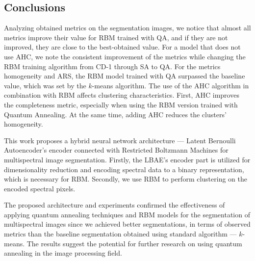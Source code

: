 \documentclass[a4paper,12pt]{article}
\begin{document}
\subsection{Conclusions}

Analyzing obtained metrics on the segmentation images, we notice that almost all metrics improve their value for RBM trained with QA, and if they are not improved, they are close to the best-obtained value. For a model that does not use AHC, we note the consistent improvement of the metrics while changing the RBM training algorithm from CD-1 through SA to QA. For the metrics homogeneity and ARS, the RBM model trained with QA surpassed the baseline value, which was set by the $k$-means algorithm. The use of the AHC algorithm in combination with RBM affects clustering characteristics. First, AHC improves the completeness metric, especially when using the RBM version trained with Quantum Annealing. At the same time, adding AHC reduces the clusters' homogeneity. 

This work proposes a hybrid neural network architecture --- Latent Bernoulli Autoencoder's encoder connected with Restricted Boltzmann Machines for multispectral image segmentation. Firstly, the LBAE's encoder part is utilized for dimensionality reduction and encoding spectral data to a binary representation, which is necessary for RBM. Secondly, we use RBM to perform clustering on the encoded spectral pixels.

The proposed architecture and experiments confirmed the effectiveness of applying quantum annealing techniques and RBM models for the segmentation of multispectral images since we achieved better segmentations, in terms of observed metrics than the baseline segmentation obtained using standard algorithm --- $k$-means. The results suggest the potential for further research on using quantum annealing in the image processing field.

\printbibliography
\end{document}
